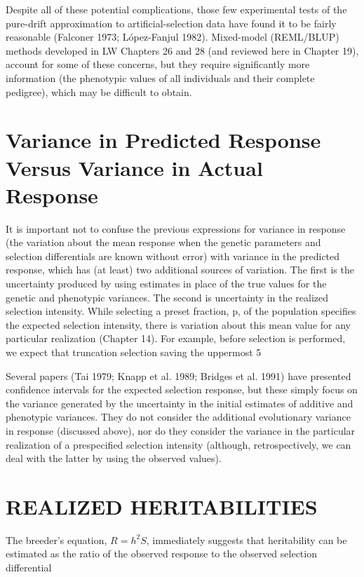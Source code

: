 \documentclass{article}
\begin{document}
Despite all of these potential complications, those few experimental tests of the pure-drift approximation to artificial-selection data have found it to be fairly reasonable (Falconer 1973; López-Fanjul 1982). Mixed-model (REML/BLUP) methods developed in LW Chapters 26 and 28 (and reviewed here in Chapter 19), account for some of these concerns, but they require significantly more information (the phenotypic values of all individuals and their complete pedigree), which may be difficult to obtain.

\section{Variance in Predicted Response Versus Variance in Actual Response}
It is important not to confuse the previous expressions for variance in response (the variation about the mean response when the genetic parameters and selection differentials are known without error) with variance in the predicted response, which has (at least) two additional sources of variation. The first is the uncertainty produced by using estimates in place of the true values for the genetic and phenotypic variances. The second is uncertainty in the realized selection intensity. While selecting a preset fraction, p, of the population specifies the expected selection intensity, there is variation about this mean value for any particular realization (Chapter 14). For example, before selection is performed, we expect that truncation selection saving the uppermost 5%

Several papers (Tai 1979; Knapp et al. 1989; Bridges et al. 1991) have presented confidence intervals for the expected selection response, but these simply focus on the variance generated by the uncertainty in the initial estimates of additive and phenotypic variances. They do not consider the additional evolutionary variance in response (discussed above), nor do they consider the variance in the particular realization of a prespecified selection intensity (although, retrospectively, we can deal with the latter by using the observed values).

\section{REALIZED HERITABILITIES}
The breeder’s equation,  $ R = h^2 S $, immediately suggests that heritability can be estimated as the ratio of the observed response to the observed selection differential
\end{document}
